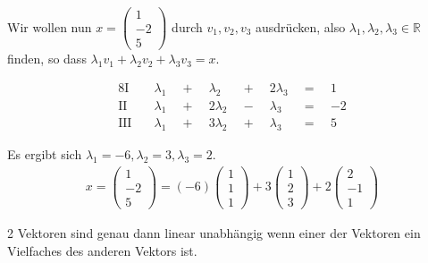 Wir wollen nun $x = \begin{pmatrix}1\\-2\\5\end{pmatrix}$ durch $v_1,v_2,v_3$ ausdrücken, also $\lambda _1, \lambda _2, \lambda _3 \in \mathbb{R}$ finden, so dass $\lambda _1 v_1 + \lambda _2 v_2 + \lambda _3 v_3 = x$.

\begin{alignat*}{8}
\text{I}\quad & \lambda _1 & \enspace+\enspace & \lambda _2 & \enspace+\enspace & 2 \lambda _3 & \enspace=\enspace & 1 \\
\text{II}\quad & \lambda _1 & \enspace+\enspace & 2 \lambda _2 & \enspace-\enspace & \lambda _3 & \enspace=\enspace & -2 \\
\text{III}\quad & \lambda _1 & \enspace+\enspace & 3 \lambda _2 & \enspace+\enspace & \lambda _3 & \enspace=\enspace & 5
\end{alignat*}

Es ergibt sich $\lambda _1 = -6, \lambda _2 = 3, \lambda _3 = 2$.
\begin{align*}
	x = \begin{pmatrix}1\\-2\\5\end{pmatrix} = (-6)\begin{pmatrix}1\\1\\1\end{pmatrix} + 3 \begin{pmatrix}1\\2\\3\end{pmatrix} + 2 \begin{pmatrix}2\\-1\\1\end{pmatrix}
\end{align*}

\vspace{0.5cm}

2 Vektoren sind genau dann linear unabhängig wenn einer der Vektoren ein Vielfaches des anderen Vektors ist.
